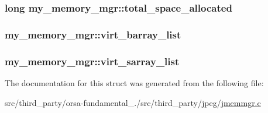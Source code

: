 \subsubsection[{total\+\_\+space\+\_\+allocated}]{\setlength{\rightskip}{0pt plus 5cm}long my\+\_\+memory\+\_\+mgr\+::total\+\_\+space\+\_\+allocated}\label{structmy__memory__mgr_acfcdee3e2d3e3d168e2a2aebe081535f}
\hypertarget{structmy__memory__mgr_a09b8c66f15f14f1c3c247d98d6c81bbc}{}
\subsubsection[{virt\+\_\+barray\+\_\+list}]{ my\+\_\+memory\+\_\+mgr\+::virt\+\_\+barray\+\_\+list}\label{structmy__memory__mgr_a09b8c66f15f14f1c3c247d98d6c81bbc}
\hypertarget{structmy__memory__mgr_ad613a2a2e52ac069c63fd083c9c91f04}{}
\subsubsection[{virt\+\_\+sarray\+\_\+list}]{ my\+\_\+memory\+\_\+mgr\+::virt\+\_\+sarray\+\_\+list}\label{structmy__memory__mgr_ad613a2a2e52ac069c63fd083c9c91f04}


The documentation for this struct was generated from the following file\+:\begin{DoxyCompactItemize}
\item 
src/third\+\_\+party/orsa-\/fundamental\+\_./src/third\+\_\+party/jpeg/\hyperlink{jmemmgr_8c}{jmemmgr.\+c}\end{DoxyCompactItemize}
